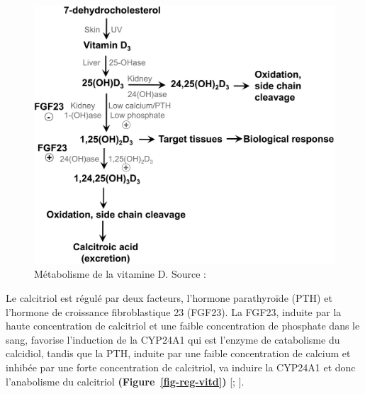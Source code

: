 \documentclass[
  letterpaper,
  DIV=11,
  numbers=noendperiod]{scrartcl}
\begin{document}
\begin{figure}

{\centering \includegraphics{figures/vitamin-d-metabolism.png}

}

\caption{\label{fig-metabolism-vitd}Métabolisme de la vitamine D. Source
: \textcite{Norman.2008}}

\end{figure}

Le calcitriol est régulé par deux facteurs, l'hormone parathyroïde (PTH)
et l'hormone de croissance fibroblastique 23 (FGF23). La FGF23, induite
par la haute concentration de calcitriol et une faible concentration de
phosphate dans le sang, favorise l'induction de la CYP24A1 qui est
l'enzyme de catabolisme du calcidiol, tandis que la PTH, induite par une
faible concentration de calcium et inhibée par une forte concentration
de calcitriol, va induire la CYP24A1 et donc l'anabolisme du calcitriol
\textbf{(Figure~\ref{fig-reg-vitd})} {[}\textcite{Dankers.2017};
\textcite{Christakos.2010}{]}.
\end{document}
